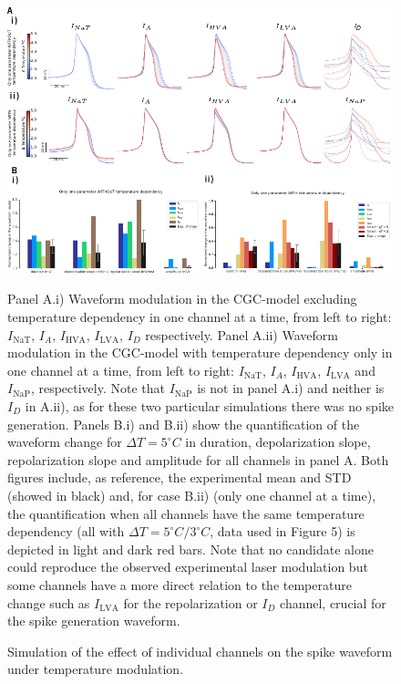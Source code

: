 \begin{figure}[htb!]
	\includegraphics[width=\textwidth]{img/laser/FigureS2.pdf}
	\caption{Simulation of the effect of individual channels on the spike waveform under temperature modulation.} Panel A.i) Waveform modulation in the CGC-model excluding temperature dependency in one channel at a time, from left to right: $I_{\textrm{NaT}}$, $I_{A}$, $I_{\textrm{HVA}}$, $I_{\textrm{LVA}}$, $I_{D}$ respectively. Panel A.ii) Waveform modulation in the CGC-model with temperature dependency only in one channel at a time, from left to right: $I_{\textrm{NaT}}$, $I_{A}$, $I_{\textrm{HVA}}$, $I_{\textrm{LVA}}$ and $I_{\textrm{NaP}}$, respectively. Note that  $I_{\textrm{NaP}}$ is not in panel A.i) and neither is $I_{D}$ in A.ii), as for these two particular simulations there was no spike generation. Panels B.i) and B.ii) show the quantification of the waveform change for $\Delta T=5^{\circ}C$ in duration, depolarization slope, repolarization slope and amplitude for all channels in panel A. Both figures include, as reference, the experimental mean and STD (showed in black) and, for case B.ii) (only one channel at a time),  the quantification when all channels have the same temperature dependency (all with $\Delta T=5^{\circ}C / 3^{\circ}C$, data used in Figure 5) is depicted in light and dark red bars. Note that no candidate alone could reproduce the observed experimental laser modulation but some channels have a more direct relation to the temperature change such as  $I_{\textrm{LVA}}$ for the repolarization or $I_{D}$ channel, crucial for the spike generation waveform.
	\label{fig:temperature simulation include exclude}

\end{figure}

